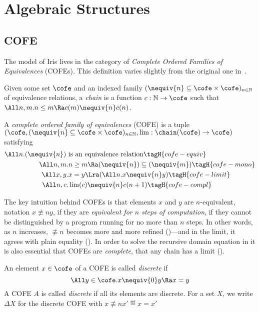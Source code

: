 \section{Algebraic Structures}

\subsection{COFE}

The model of Iris lives in the category of \emph{Complete Ordered Families of Equivalences} (COFEs).
This definition varies slightly from the original one in~\cite{catlogic}.

\begin{defn}[Chain]
  Given some set $\cofe$ and an indexed family $({\nequiv{n}} \subseteq \cofe \times \cofe)_{n \in \mathbb{N}}$ of equivalence relations, a \emph{chain} is a function $c : \mathbb{N} \to \cofe$ such that $\All n, m. n \leq m \Ra c (m) \nequiv{n} c (n)$.
\end{defn}

\begin{defn}
  A \emph{complete ordered family of equivalences} (COFE) is a tuple $(\cofe, ({\nequiv{n}} \subseteq \cofe \times \cofe)_{n \in \mathbb{N}}, \lim : \chain(\cofe) \to \cofe)$ satisfying
  \begin{align*}
    \All n. (\nequiv{n}) ~& \text{is an equivalence relation} \tagH{cofe-equiv} \\
    \All n, m.& n \geq m \Ra (\nequiv{n}) \subseteq (\nequiv{m}) \tagH{cofe-mono} \\
    \All x, y.& x = y \Lra (\All n. x \nequiv{n} y) \tagH{cofe-limit} \\
    \All n, c.& \lim(c) \nequiv{n} c(n+1) \tagH{cofe-compl}
  \end{align*}
\end{defn}

The key intuition behind COFEs is that elements $x$ and $y$ are $n$-equivalent, notation $x \nequiv{n} y$, if they are \emph{equivalent for $n$ steps of computation}, \ie if they cannot be distinguished by a program running for no more than $n$ steps.
In other words, as $n$ increases, $\nequiv{n}$ becomes more and more refined ()---and in the limit, it agrees with plain equality ().
In order to solve the recursive domain equation in  it is also essential that COFEs are \emph{complete}, \ie that any chain has a limit ().

\begin{defn}
  An element $x \in \cofe$ of a COFE is called \emph{discrete} if
  \[ \All y \in \cofe. x \nequiv{0} y \Ra x = y\]
  A COFE $A$ is called \emph{discrete} if all its elements are discrete.
  For a set $X$, we write $\Delta X$ for the discrete COFE with $x \nequiv{n} x' \eqdef x = x'$

\end{defn}

